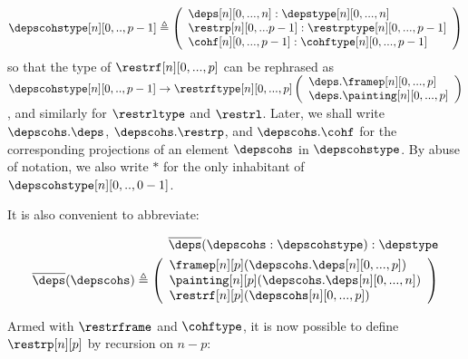 \documentclass{msc}
\newcommand{\unitpoint}{\ensuremath{\ast}}
\newcommand{\defeq}{\ensuremath{\triangleq}}
\begin{document}
\begin{align*}
  \depscohstype[n][0,..,p-1] \defeq
  \left(\begin{array}{l}
            \deps[n][0,...,n] :\depstype[n][0,...,n]        \\
            \restrp[n][0,...p-1]: \restrptype[n][0,...,p-1] \\
            \cohf[n][0,...,p-1]: \cohftype[n][0,...,p-1]    \\
          \end{array}\right)
\end{align*}
so that the type of $\restrf[n][0,...,p]$ can be rephrased as $\depscohstype[n][0,..,p-1] \rightarrow \restrftype[n][0,...,p]      \left(\begin{array}{l}
                \deps.\framep[n][0,...,p]   \\
                \deps.\painting[n][0,...,p] \\
              \end{array}\right)$, and similarly for $\restrltype$ and $\restrl$. Later, we shall write $\depscohs.\deps$, $\depscohs.\restrp$, and $\depscohs.\cohf$ for the corresponding projections of an element $\depscohs$ in $\depscohstype$. By abuse of notation, we also write $\unitpoint$ for the only inhabitant of $\depscohstype[n][0,..,0-1]$.

It is also convenient to abbreviate:

\begin{align*}
  \overline{\deps}(\depscohs:\depscohstype) : \depstype\\
  \overline{\deps}(\depscohs) \defeq
\left(\begin{array}{l}
            \framep[n][p](\depscohs.\deps[n][0,...,p])   \\
            \painting[n][p](\depscohs.\deps[n][0,...,n]) \\
            \restrf[n][p](\depscohs[n][0,...,p])\\
      \end{array}\right)\\
\end{align*}

Armed with $\restrframe$ and $\cohftype$, it is now possible to define
$\restrp[n][p]$ by recursion on $n-p$:
\end{document}
